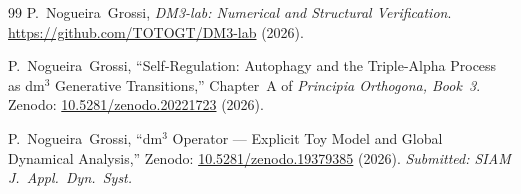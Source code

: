 \documentclass[12pt,a4paper]{article}
\begin{document}
\begin{thebibliography}{99}
P.~Nogueira~Grossi,
\textit{DM3-lab: Numerical and Structural Verification}.
\url{https://github.com/TOTOGT/DM3-lab} (2026).

P.~Nogueira~Grossi,
``Self-Regulation: Autophagy and the Triple-Alpha Process as
dm$^3$ Generative Transitions,''
Chapter~A of \textit{Principia Orthogona, Book~3}.
Zenodo:
\href{https://doi.org/10.5281/zenodo.20221723}{10.5281/zenodo.20221723}
(2026).

P.~Nogueira~Grossi,
``dm$^3$ Operator --- Explicit Toy Model and Global Dynamical Analysis,''
Zenodo:
\href{https://doi.org/10.5281/zenodo.19379385}{10.5281/zenodo.19379385}
(2026). \textit{Submitted: SIAM J.\ Appl.\ Dyn.\ Syst.}

\end{thebibliography}
\end{document}
